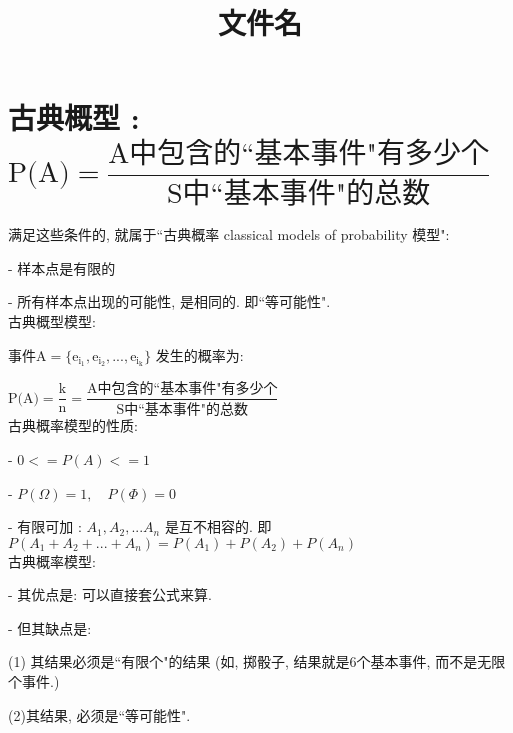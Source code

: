 \documentclass[UTF8]{ctexart}
\title{文件名}
\begin{document}
	\tableofcontents %
	\date{} %
	\maketitle  %
	
	
	
	
	\part{古典概型 : $
		\text{P(A)}=\dfrac{\text{A中包含的``基本事件"有多少个}}{\text{S中``基本事件"的总数}}$}
	
	
	满足这些条件的, 就属于``古典概率  classical models of probability 模型":
	
	- 样本点是有限的
	
	- 所有样本点出现的可能性, 是相同的. 即``等可能性". \\
	
	
	古典概型模型:
	
	事件$\text{A}=\{\text{e}_{\text{i}_1},\text{e}_{\text{i}_2},...,\text{e}_{\text{i}_{\text{k}}}\}$ 发生的概率为:
	
	$
	\text{P(A)}=\dfrac{\text{k}}{\text{n}}=\dfrac{\text{A中包含的``基本事件"有多少个}}{\text{S中``基本事件"的总数}}
	$ \\
	
	
	古典概率模型的性质:
	
	- $0 <= P(A) <= 1$
	
	- $P(\Omega)=1, \quad  P(\Phi)=0$
	
	- 有限可加 : $ A_1, A_2, ... A_n$ 是互不相容的. 即 $P(A_1 +A_2 + ...+ A_n)= P(A_1) +  P(A_2)  + P(A_n)$ \\
	
	古典概率模型: 
	
	- 其优点是: 可以直接套公式来算. 
	
	- 但其缺点是: 
	
	(1) 其结果必须是``有限个"的结果 (如, 掷骰子, 结果就是6个基本事件, 而不是无限个事件.) 
	
	(2)其结果, 必须是``等可能性". \\
	
	
	
\end{document}
